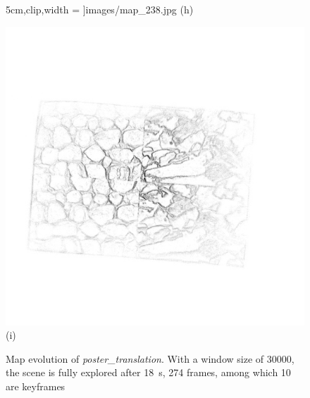 \begin{figure}[h]
\begin{minipage}[t]{0.3\textwidth}
{        5cm},clip,width = \textwidth]{images/map_238.jpg} (h)
    \end{minipage}
    \hfill
    \begin{minipage}[t]{0.3\textwidth}
      \centering \includegraphics[trim={1.5cm 4cm 2.5cm
        5cm},clip,width = \textwidth]{images/map_273.jpg} (i)
    \end{minipage} \caption{Map evolution of
      \emph{poster\_translation}. With a window size of \num{30000},
      the scene is fully explored after \SI{18}{\second}, 274 frames,
      among which 10 are keyframes}
    \label{fig:poster_translation_map}
  \end{figure}


